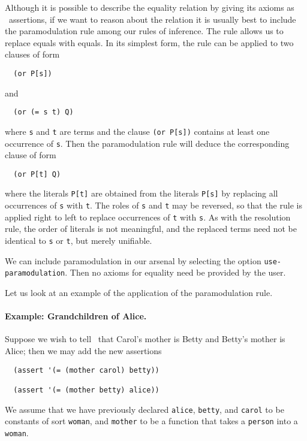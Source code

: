 Although it is possible to describe the equality relation by giving
its axioms as \snark\  assertions, if we want to reason about the
relation it is usually best to include the paramodulation rule among
our rules of inference.   The rule allows us to replace equals with
equals.  In its simplest form, the rule can be applied to two clauses
of form
\begin{verbatim}
  (or P[s])
\end{verbatim}
and
\begin{verbatim}
  (or (= s t) Q)
\end{verbatim}
where {\tt s} and {\tt t} are terms and the clause \verb'(or P[s])'
 contains at least one occurrence of {\tt s}.  Then the paramodulation
 rule will deduce the corresponding clause of form
\begin{verbatim}
  (or P[t] Q)
\end{verbatim}
where the literals \verb'P[t]' are obtained from the literals
  \verb'P[s]' by replacing all occurrences of {\tt s} with {\tt t}.
  The roles of {\tt s} and {\tt t} may be reversed, so that the rule
  is applied right to left to replace occurrences of {\tt t} with
  {\tt s}.  As with the resolution rule, the order of literals is not
  meaningful, and the replaced terms need not be identical to {\tt s}
  or {\tt t}, but merely unifiable.

We can include paramodulation in our arsenal by selecting the option
{\tt use-paramodulation}.
Then no axioms for equality need be provided by the user.

Let us look at an example of the application of the paramodulation
rule.


\paragraph{Example: Grandchildren of Alice.}
\label{example-grandchildren-of-alice}
Suppose we wish to tell \snark\  that Carol's mother is
Betty and Betty's mother is Alice; then we may add the new assertions
\begin{verbatim}
  (assert '(= (mother carol) betty))

  (assert '(= (mother betty) alice))
\end{verbatim}
We assume that we have previously declared {\tt alice}, {\tt betty},
and {\tt carol} to be constants of sort {\tt woman}, and {\tt mother}
to be a function that takes a {\tt person} into a {\tt woman}.

